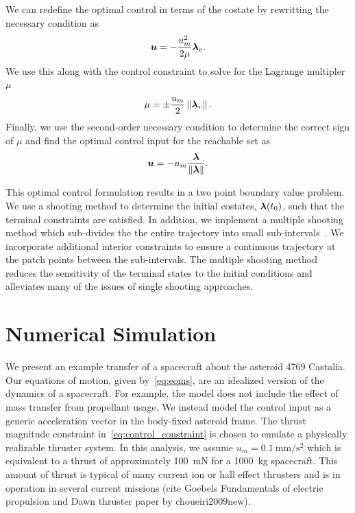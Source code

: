\documentclass[]{aiaa-tc}%
\begin{document}
We can redefine the optimal control in terms of the costate by rewritting the necessary condition as
\begin{align*}
    \bm{u} = - \frac{u_m^2}{2 \mu} \bm{\lambda}_v .
\end{align*}
We use this along with the control constraint to solve for the Lagrange multipler \( \mu \)
\begin{align*}
    \mu = \pm \frac{u_m}{2} \left\| \bm{\lambda}_v \right\| .
\end{align*}
Finally, we use the second-order necessary condition to determine the correct sign of \( \mu \) and find the optimal control input for the reachable set as
\begin{align}\label{eq:optimal_control}
    \bm{u} = - u_m \frac{\bm{\lambda}}{\left\| \bm{\lambda} \right\|} .
\end{align}

This optimal control formulation results in a two point boundary value problem.
We use a shooting method to determine the initial costates, \( \bm{\lambda}(t_0)\), such that the terminal constraints are satisfied.
In addition, we implement a multiple shooting method which sub-divides the the entire trajectory into small sub-intervals~\cite{stoer2013}.
We incorporate additional interior constraints to ensure a continuous trajectory at the patch points between the sub-intervals.
The multiple shooting method reduces the sensitivity of the terminal states to the initial conditions and alleviates many of the issues of single shooting approaches.

\section{Numerical Simulation}\label{sec:simulation}

We present an example transfer of a spacecraft about the asteroid 4769 Castalia. 
Our equations of motion, given by~\cref{eq:eoms}, are an idealized version of the dynamics of a spacecraft.
For example, the model does not include the effect of mass transfer from propellant usage. 
We instead model the control input as a generic acceleration vector in the body-fixed asteroid frame. 
The thrust magnitude constraint in~\cref{eq:control_constraint} is chosen to emulate a physically realizable thruster system.
In this analysis, we assume \( u_m = \SI{0.1}{\milli\meter\per\second\squared}\) which is equivalent to a thrust of approximately \SI{100}{\milli\newton} for a \SI{1000}{\kilo\gram} spacecraft.
This amount of thrust is typical of many current ion or hall effect thrusters and is in operation in several current missions (cite Goebels Fundamentals of electric propulsion and Dawn thruster paper by choueiri2009new).
\end{document}
